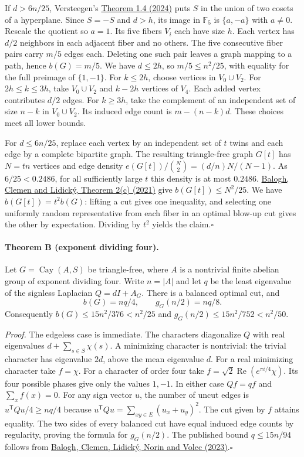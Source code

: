 \documentclass[11pt]{article}
\begin{document}
If $d>6n/25$, Versteegen's
\href{https://doi.org/10.1093/qmath/haae042}{Theorem 1.4 (2024)}
puts $S$ in the union of two cosets of a hyperplane. Since $S=-S$ and
$d>h$, its image in $\mathbb F_5$ is $\{a,-a\}$ with $a\ne0$.
Rescale the quotient so $a=1$. Its five fibers $V_i$ each have size $h$.
Each vertex has $d/2$ neighbors in each adjacent fiber and no others.
The five consecutive fiber pairs carry $m/5$ edges each. Deleting one
such pair leaves a graph mapping to a path, hence $b(G)=m/5$. We have
$d\le2h$, so $m/5\le n^2/25$, with equality for the full preimage of
$\{1,-1\}$. For $k\le2h$, choose vertices in $V_0\cup V_2$. For
$2h\le k\le3h$, take $V_0\cup V_2$ and $k-2h$ vertices of $V_4$. Each
added vertex contributes $d/2$ edges. For $k\ge3h$, take the complement
of an independent set of size $n-k$ in $V_0\cup V_2$. Its induced edge
count is $m-(n-k)d$. These choices meet all lower bounds.

For $d\le6n/25$, replace each vertex by an independent set of $t$ twins
and each edge by a complete bipartite graph. The resulting triangle-free
graph $G[t]$ has $N=tn$ vertices and edge density
$e(G[t])/\binom{N}{2}=(d/n)N/(N-1)$. As $6/25<0.2486$, for all
sufficiently large $t$ this density is at most $0.2486$.
\href{https://arxiv.org/abs/2103.14179}{Balogh, Clemen and Lidick\'y,
Theorem 2(c) (2021)} give $b(G[t])\le N^2/25$. We have
$b(G[t])=t^2b(G)$: lifting a cut gives one inequality, and selecting
one uniformly random representative from each fiber in an optimal
blow-up cut gives the other by expectation. Dividing by $t^2$ yields
the claim.\hfill$\square$

\paragraph{Theorem B (exponent dividing four).}
Let $G=\operatorname{Cay}(A,S)$ be triangle-free, where $A$ is a nontrivial
finite abelian group of exponent dividing four. Write $n=|A|$ and let
$q$ be the least eigenvalue of the signless Laplacian $Q=dI+A_G$.
There is a balanced optimal cut, and
\[
 b(G)=nq/4,\qquad g_G(n/2)=nq/8.
\]
Consequently $b(G)\le15n^2/376<n^2/25$ and
$g_G(n/2)\le15n^2/752<n^2/50$.

\noindent\emph{Proof.}
The edgeless case is immediate. The characters diagonalize $Q$ with
real eigenvalues $d+\sum_{s\in S}\chi(s)$. A minimizing character is
nontrivial: the trivial character has eigenvalue $2d$, above the mean
eigenvalue $d$. For a real minimizing character take $f=\chi$. For a
character of order four take $f=\sqrt2\operatorname{Re}(e^{\pi i/4}\chi)$.
Its four possible phases give only the values $1,-1$. In either case
$Qf=qf$ and $\sum_x f(x)=0$. For any sign vector $u$, the number of uncut
edges is $u^{\mathsf T}Qu/4\ge nq/4$ because
$u^{\mathsf T}Qu=\sum_{xy\in E}(u_x+u_y)^2$. The cut given by $f$
attains equality. The two sides of every balanced cut have equal
induced edge counts by regularity, proving the formula for $g_G(n/2)$.
The published bound $q\le15n/94$ follows from
\href{https://doi.org/10.1137/22M150767X}{Balogh, Clemen, Lidick\'y,
Norin and Volec (2023)}.\hfill$\square$
\end{document}
